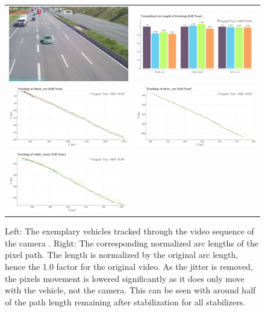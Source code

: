


\begin{figure}[!ht]
  \centering
  \begin{tabular}{cc}
    \includegraphics[width=0.45\linewidth]{diagrams/object_tracking/s40_n_near/frame.png}    &  
    \includegraphics[width=0.475\linewidth]{diagrams/object_tracking/s40_n_near/arcs.png}    \\

    \includegraphics[width=0.475\linewidth]{diagrams/object_tracking/s40_n_near/black_car.png}    &  
    \includegraphics[width=0.475\linewidth]{diagrams/object_tracking/s40_n_near/silver_car.png}    \\  
    \includegraphics[width=0.475\linewidth]{diagrams/object_tracking/s40_n_near/white_truck.png}   
  \end{tabular}
  \caption{Left: 
  The exemplary vehicles tracked through the video sequence of the camera . 
  Right:
  The corresponding normalized arc lengths of the pixel path. 
  The length is normalized by the original arc length, hence the 1.0 factor for the original video. 
  As the jitter is removed, the pixels movement is lowered significantly as it does only move with the vehicle, not the camera.
  This can be seen with around half of the path length remaining after stabilization for all stabilizers.
  }
  \label{fig:object_tracking_appendix_s40_n_near}
\end{figure}



